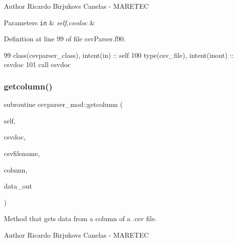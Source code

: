 \begin{DoxyAuthor}{Author}
Ricardo Birjukovs Canelas -\/ M\+A\+R\+E\+T\+EC 
\end{DoxyAuthor}

\begin{DoxyParams}[1]{Parameters}
\mbox{\tt in}  & {\em self,csvdoc} & \\
\hline
\end{DoxyParams}


Definition at line 99 of file csv\+Parser.\+f90.


\begin{DoxyCode}
99     \textcolor{keywordtype}{class}(csvparser\_class), \textcolor{keywordtype}{intent(in)} :: self
100     \textcolor{keywordtype}{type}(csv\_file), \textcolor{keywordtype}{intent(inout)} :: csvdoc
101     \textcolor{keyword}{call }csvdoc%
\end{DoxyCode}
\mbox{\label{namespacecsvparser__mod_ae966faafebb8c4035e12e0bb24de717c}} 
\subsubsection{\texorpdfstring{getcolumn()}{getcolumn()}}
{\footnotesize\ttfamily subroutine csvparser\+\_\+mod\+::getcolumn (\begin{DoxyParamCaption}\item[{class(\mbox{\hyperlink{structcsvparser__mod_1_1csvparser__class}{csvparser\+\_\+class}}), intent(in)}]{self,  }\item[{type(csv\+\_\+file), intent(inout)}]{csvdoc,  }\item[{type(string), intent(in)}]{csvfilename,  }\item[{integer, intent(in)}]{column,  }\item[{real(prec), dimension(\+:), allocatable}]{data\+\_\+out }\end{DoxyParamCaption})\hspace{0.3cm}{\ttfamily [private]}}



Method that gets data from a column of a .csv file. 

\begin{DoxyAuthor}{Author}
Ricardo Birjukovs Canelas -\/ M\+A\+R\+E\+T\+EC 
\end{DoxyAuthor}


